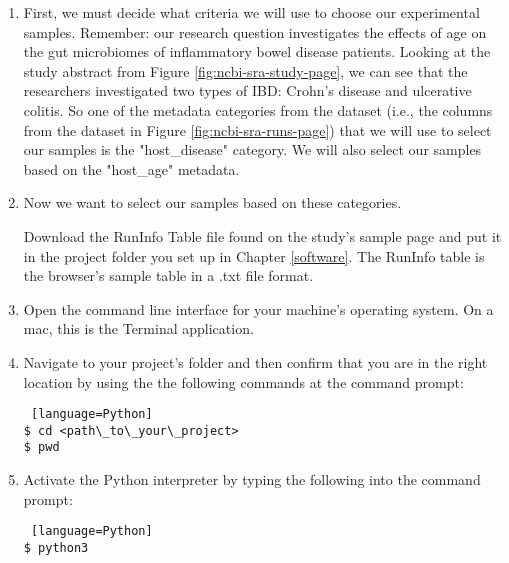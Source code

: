         \begin{enumerate}
            \item First, we must decide what criteria we will use to choose our experimental samples. 
            \newline
            Remember: our research question investigates the effects of age on the gut microbiomes of inflammatory bowel disease patients. Looking at the study abstract from Figure \ref{fig:ncbi-sra-study-page}, we can see that the researchers investigated two types of IBD: Crohn's disease and ulcerative colitis. So one of the metadata categories from the dataset (i.e., the columns from the dataset in Figure \ref{fig:ncbi-sra-runs-page}) that we will use to select our samples is the "host\_disease" category. We will also select our samples based on the "host\_age" metadata.
            
            \item Now we want to select our samples based on these categories. 
            
            Download the RunInfo Table file found on the study's sample page and put it in the project folder you set up in Chapter \ref{software}. The RunInfo table is the browser's sample table in a .txt file format.
            
            \item Open the command line interface for your machine's operating system. On a mac, this is the Terminal application. 
            
            \item Navigate to your project's folder and then confirm that you are in the right location by using the the following commands at the command prompt:
            
                \begin{lstlisting} [language=Python]
$ cd <path\_to\_your\_project>
$ pwd
                \end{lstlisting}
                        
            \item Activate the Python interpreter by typing the following into the command prompt:
                \begin{lstlisting} [language=Python]
$ python3
                \end{lstlisting}
            

\end{enumerate}
